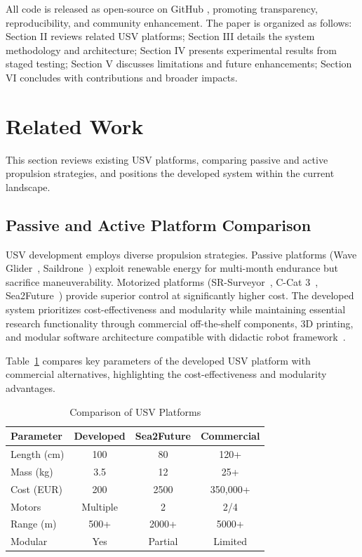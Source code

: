 \documentclass[conference]{IEEEtran}
\begin{document}
All code is released as open-source on GitHub \cite{github-usv} , promoting transparency, reproducibility, and community enhancement. The paper is organized as follows: Section II reviews related USV platforms; Section III details the system methodology and architecture; Section IV presents experimental results from staged testing; Section V discusses limitations and future enhancements; Section VI concludes with contributions and broader impacts.

\section{Related Work}
\label{sec:related}
This section reviews existing USV platforms, comparing passive and active propulsion strategies, and positions the developed system within the current landscape.
\subsection{Passive and Active Platform Comparison}
USV development employs diverse propulsion strategies. Passive platforms (Wave Glider~\cite{wave-glider}, Saildrone~\cite{saildrone}) exploit renewable energy for multi-month endurance but sacrifice maneuverability. Motorized platforms (SR-Surveyor~\cite{sr-surveyor-class}, C-Cat 3~\cite{c-cat-3-asv}, Sea2Future~\cite{sea2future}) provide superior control at significantly higher cost. The developed system prioritizes cost-effectiveness and modularity while maintaining essential research functionality through commercial off-the-shelf components, 3D printing, and modular software architecture compatible with didactic robot framework~\cite{didactic-robot-thesis}.

Table~\ref{tab:comparison} compares key parameters of the developed USV platform with commercial alternatives, highlighting the cost-effectiveness and modularity advantages.

\begin{table}[htbp]
\centering
\caption{Comparison of USV Platforms}
\label{tab:comparison}
\begin{tabular}{|l|c|c|c|}
\hline
\textbf{Parameter} & \textbf{Developed} & \textbf{Sea2Future} & \textbf{Commercial} \\
\hline
Length (cm) & 100 & 80 & 120+ \\
Mass (kg) & 3.5 & 12 & 25+ \\
Cost (EUR) & 200 & 2500 &  350,000+ \\
Motors & Multiple & 2 & 2/4 \\
Range (m) & 500+ & 2000+ & 5000+ \\
Modular & Yes & Partial & Limited \\
\hline
\end{tabular}
\end{table}
\end{document}
